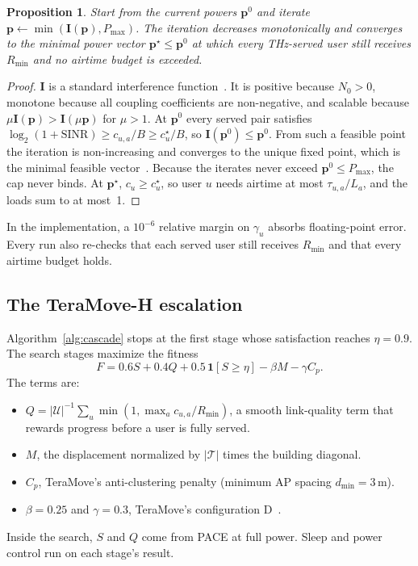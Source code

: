 \documentclass[conference]{IEEEtran}
\newtheorem{proposition}{Proposition}
\newcommand{\Rmin}{R_{\min}}
\newcommand{\Pmax}{P_{\max}}
\begin{document}
\begin{proposition}\label{prop:yates}
Start from the current powers $\mathbf{p}^0$ and iterate $\mathbf{p}\leftarrow\min(\mathbf{I}(\mathbf{p}),\Pmax)$.
The iteration decreases monotonically and converges to the minimal power vector $\mathbf{p}^\star\le\mathbf{p}^0$ at which every THz-served user still receives $\Rmin$ and no airtime budget is exceeded.
\end{proposition}
\begin{proof}
$\mathbf{I}$ is a standard interference function~\cite{yates1995framework}.
It is positive because $N_0>0$, monotone because all coupling coefficients are non-negative, and scalable because $\mu\mathbf{I}(\mathbf{p})>\mathbf{I}(\mu\mathbf{p})$ for $\mu>1$.
At $\mathbf{p}^0$ every served pair satisfies $\log_2(1+\mathrm{SINR})\ge c_{u,a}/B\ge c^\star_u/B$, so $\mathbf{I}(\mathbf{p}^0)\le\mathbf{p}^0$.
From such a feasible point the iteration is non-increasing and converges to the unique fixed point, which is the minimal feasible vector~\cite{yates1995framework}.
Because the iterates never exceed $\mathbf{p}^0\le\Pmax$, the cap never binds.
At $\mathbf{p}^\star$, $c_u\ge c^\star_u$, so user $u$ needs airtime at most $\tau_{u,a}/L_a$, and the loads sum to at most~1.
\end{proof}

In the implementation, a $10^{-6}$ relative margin on $\gamma_u$ absorbs floating-point error.
Every run also re-checks that each served user still receives $\Rmin$ and that every airtime budget holds.

\subsection{The TeraMove-H escalation}
Algorithm~\ref{alg:cascade} stops at the first stage whose satisfaction reaches $\eta=0.9$.
The search stages maximize the fitness
\begin{equation}
F=0.6S+0.4Q+0.5\,\mathbf{1}[S\ge\eta]-\beta M-\gamma C_p.\label{eq:fit}
\end{equation}
The terms are:
\begin{itemize}
\item $Q=|\mathcal{U}|^{-1}\sum_u\min(1,\max_a c_{u,a}/\Rmin)$, a smooth link-quality term that rewards progress before a user is fully served.
\item $M$, the displacement normalized by $|\mathcal{T}|$ times the building diagonal.
\item $C_p$, TeraMove's anti-clustering penalty (minimum AP spacing $d_{\min}=3$\,m).
\item $\beta=0.25$ and $\gamma=0.3$, TeraMove's configuration D~\cite{anon2026teramove}.
\end{itemize}
Inside the search, $S$ and $Q$ come from PACE at full power.
Sleep and power control run on each stage's result.
\end{document}
